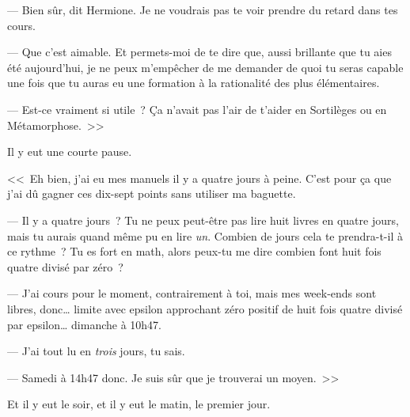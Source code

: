 --- Bien sûr, dit Hermione. Je ne voudrais pas te voir prendre du retard dans tes cours.

--- Que c'est aimable. Et permets-moi de te dire que, aussi brillante que tu aies été aujourd'hui, je ne peux m'empêcher de me demander de quoi tu seras capable une fois que tu auras eu une formation à la rationalité des plus élémentaires.

--- Est-ce vraiment si utile~? Ça n'avait pas l'air de t'aider en Sortilèges ou en Métamorphose.~>>

Il y eut une courte pause.

<<~Eh bien, j'ai eu mes manuels il y a quatre jours à peine. C'est pour ça que j'ai dû gagner ces dix-sept points sans utiliser ma baguette.

--- Il y a quatre jours~? Tu ne peux peut-être pas lire huit livres en quatre jours, mais tu aurais quand même pu en lire \emph{un}. Combien de jours cela te prendra-t-il à ce rythme~? Tu es fort en math, alors peux-tu me dire combien font huit fois quatre divisé par zéro~?

--- J'ai cours pour le moment, contrairement à toi, mais mes week-ends sont libres, donc… limite avec epsilon approchant zéro positif de huit fois quatre divisé par epsilon… dimanche à 10h47.

--- J'ai tout lu en \emph{trois} jours, tu sais.

--- Samedi à 14h47 donc. Je suis sûr que je trouverai un moyen.~>>

Et il y eut le soir, et il y eut le matin, le premier jour.

